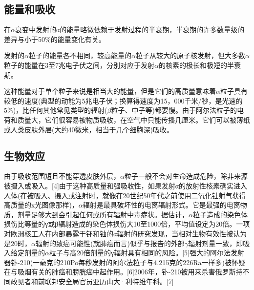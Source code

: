 \subsection{能量和吸收}
在$\alpha$衰变中发射的α的能量略微依赖于发射过程的半衰期，半衰期的许多数量级的差异与小于50\%的能量变化有关。

发射的$\alpha$粒子的能量各不相同，较高能量的$\alpha$粒子从较大的原子核发射，但大多数$\alpha$粒子的能量在3至7兆电子伏之间，分别对应于发射$\alpha$的核素的极长和极短的半衰期。

这种能量对于单个粒子来说是相当大的能量，但是它们的高质量意味着$\alpha$粒子具有较低的速度(典型的动能为5兆电子伏；换算得速度为15，000千米/秒，是光速的5\%)，比任何其他常见类型的辐射($\beta$粒子、中子等)都要慢。由于阿尔法粒子的电荷和质量大，它们很容易被物质吸收，在空气中只能传播几厘米。它们可以被薄纸或人类皮肤外层(大约40微米，相当于几个细胞深)吸收。

\subsection{生物效应}
由于吸收范围短且不能穿透皮肤外层，$\alpha$粒子一般不会对生命造成危险，除非来源被摄入或吸入。[4]由于这种高质量和强吸收性，如果发射α的放射性核素确实进入人体(在被吸入、摄入或注射时，就像在20世纪50年代之前使用二氧化钍射气获得高质量的x光图像那样)，$\alpha$辐射是最具破坏性的电离辐射形式。它是最强的电离物质，剂量足够大到会引起任何或所有辐射中毒症状。据估计，$\alpha$粒子造成的染色体损伤比等量的γ或β辐射造成的染色体损伤大10至1000倍，平均值设定为20倍。一项对欧洲核工人在内部暴露于钚和铀的α辐射的研究发现，当相对生物有效性被认为是20时，$\alpha$辐射的致癌可能性(就肺癌而言)似乎与报告的外部$\gamma$辐射剂量一致，即吸入给定剂量的$\alpha$粒子与高20倍剂量的γ辐射具有相同的风险。[5]强大的阿尔法发射器钋-210(一毫克的210Po每秒发射的阿尔法粒子与4.215克的226Ra一样多)被怀疑在与吸烟有关的肺癌和膀胱癌中起作用。[6]2006年，钋-210被用来杀害俄罗斯持不同政见者和前联邦安全局官员亚历山大·利特维年科。[7]